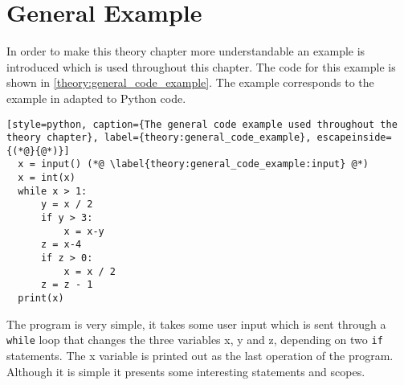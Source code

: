\section{General Example}
In order to make this theory chapter more understandable an example is introduced which is used throughout this chapter.
The code for this example is shown in \cref{theory:general_code_example}.
The example corresponds to the example in \citet{schwartzbach} adapted to Python code.
\begin{lstlisting}[style=python, caption={The general code example used throughout the theory chapter}, label={theory:general_code_example}, escapeinside={(*@}{@*)}]
  x = input() (*@ \label{theory:general_code_example:input} @*)
  x = int(x)
  while x > 1:
      y = x / 2
      if y > 3:
          x = x-y
      z = x-4
      if z > 0:
          x = x / 2
      z = z - 1
  print(x)
\end{lstlisting}

The program is very simple, it takes some user input which is sent through a \texttt{while} loop that changes the three variables x, y and z, depending on two \texttt{if} statements.
The x variable is printed out as the last operation of the program.
Although it is simple it presents some interesting statements and scopes.
